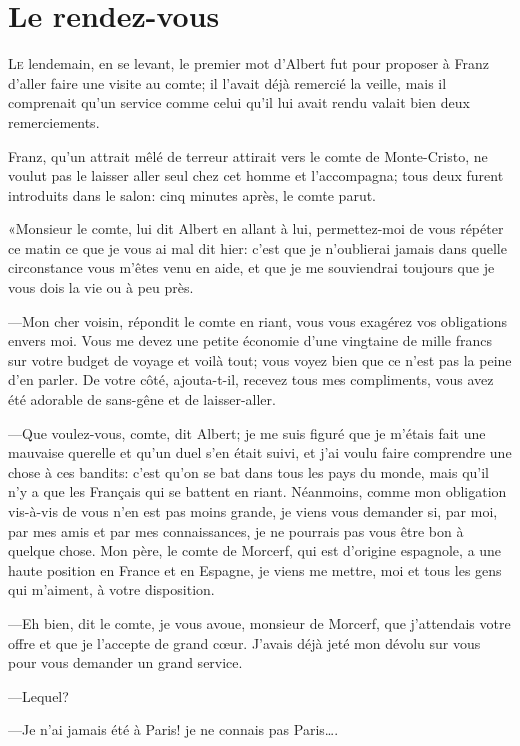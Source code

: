 \chapter{Le rendez-vous}

\lettrine{L}{e} lendemain, en se levant, le premier mot d'Albert fut pour proposer à Franz d'aller faire une visite au comte; il l'avait déjà remercié la veille, mais il comprenait qu'un service comme celui qu'il lui avait rendu valait bien deux remerciements. 

Franz, qu'un attrait mêlé de terreur attirait vers le comte de Monte-Cristo, ne voulut pas le laisser aller seul chez cet homme et l'accompagna; tous deux furent introduits dans le salon: cinq minutes après, le comte parut. 

«Monsieur le comte, lui dit Albert en allant à lui, permettez-moi de vous répéter ce matin ce que je vous ai mal dit hier: c'est que je n'oublierai jamais dans quelle circonstance vous m'êtes venu en aide, et que je me souviendrai toujours que je vous dois la vie ou à peu près. 

—Mon cher voisin, répondit le comte en riant, vous vous exagérez vos obligations envers moi. Vous me devez une petite économie d'une vingtaine de mille francs sur votre budget de voyage et voilà tout; vous voyez bien que ce n'est pas la peine d'en parler. De votre côté, ajouta-t-il, recevez tous mes compliments, vous avez été adorable de sans-gêne et de laisser-aller. 

—Que voulez-vous, comte, dit Albert; je me suis figuré que je m'étais fait une mauvaise querelle et qu'un duel s'en était suivi, et j'ai voulu faire comprendre une chose à ces bandits: c'est qu'on se bat dans tous les pays du monde, mais qu'il n'y a que les Français qui se battent en riant. Néanmoins, comme mon obligation vis-à-vis de vous n'en est pas moins grande, je viens vous demander si, par moi, par mes amis et par mes connaissances, je ne pourrais pas vous être bon à quelque chose. Mon père, le comte de Morcerf, qui est d'origine espagnole, a une haute position en France et en Espagne, je viens me mettre, moi et tous les gens qui m'aiment, à votre disposition. 

—Eh bien, dit le comte, je vous avoue, monsieur de Morcerf, que j'attendais votre offre et que je l'accepte de grand cœur. J'avais déjà jeté mon dévolu sur vous pour vous demander un grand service. 

—Lequel? 

—Je n'ai jamais été à Paris! je ne connais pas Paris\dots. 

